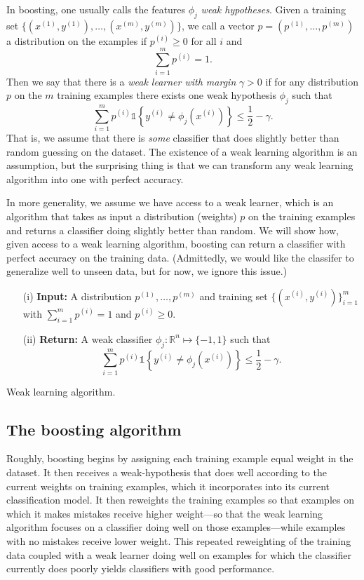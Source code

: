 In boosting, one usually calls the features $\phi_j$ \textit{weak hypotheses}. Given a
training set $\{(x^{(1)}, y^{(1)}),\ldots,(x^{(m)},y^{(m)})\}$, we call a vector $p = (p^{(1)},\ldots,p^{(m)})$ a %
distribution on the examples if $p^{(i)} \ge 0$ for all $i$ and
\[
\sum_{i=1}^m p^{(i)} = 1.
\]
Then we say that there is a \textit{weak learner with margin} $\gamma > 0$ if for any
distribution $p$ on the $m$ training examples there exists one weak hypothesis
$\phi_j$ such that
\begin{equation}\label{eq:margin}
    \sum_{i=1}^m p^{(i)} \mathbb{1}\left\{y^{(i)} \ne \phi_j (x^{(i)} )\right\} \le \frac{1}{2} - \gamma.
\end{equation}
That is, we assume that there is \textit{some} classifier that does slightly better than
random guessing on the dataset. The existence of a weak learning algorithm
is an assumption, but the surprising thing is that we can transform any weak
learning algorithm into one with perfect accuracy.

In more generality, we assume we have access to a weak learner, which is
an algorithm that takes as input a distribution (weights) $p$ on the training
examples and returns a classifier doing slightly better than random. We will
show how, given access to a weak learning algorithm, boosting can return a
classifier with perfect accuracy on the training data. (Admittedly, we would
like the classifer to generalize well to unseen data, but for now, we ignore
this issue.)

\begin{algorithm}
    \begin{itemize}
        \item[(i)] \textbf{Input:}  A distribution $p^{(1)} ,\ldots,p^{(m)}$ and training set $\{(x^{(i)} ,y^{(i)})\}^m_{i=1}$ with $\sum_{i=1}^m p^{(i)} = 1$ and $p^{(i)} \ge 0$.
        \item[(ii)] \textbf{Return:} A weak classifier $\phi_j : \mathbb R^n \mapsto \{-1,1\}$ such that
        \[
            \sum_{i=1}^m p^{(i)} \mathbb{1}\left\{y^{(i)} \ne \phi_j (x^{(i)} ) \right\} \le \frac{1}{2} - \gamma.
        \]
    \end{itemize}
    \caption{Weak learning algorithm.}\label{alg:weak_learning}
\end{algorithm}

\subsection{The boosting algorithm}
Roughly, boosting begins by assigning each training example equal weight
in the dataset. It then receives a weak-hypothesis that does well according
to the current weights on training examples, which it incorporates into its
current classification model. It then reweights the training examples so that
examples on which it makes mistakes receive higher weight---so that the weak
learning algorithm focuses on a classifier doing well on those examples---while
examples with no mistakes receive lower weight. This repeated reweighting
of the training data coupled with a weak learner doing well on examples for
which the classifier currently does poorly yields classifiers with good performance.

